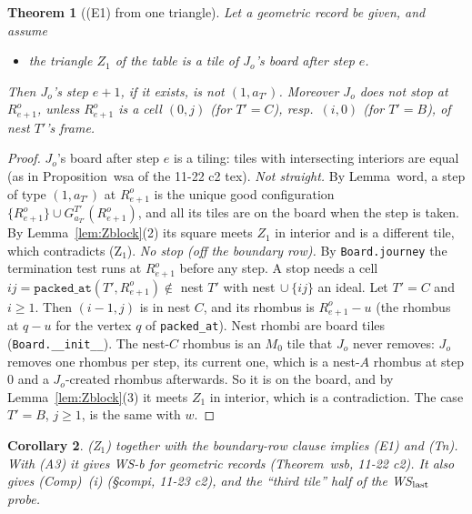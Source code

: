 \documentclass[11pt]{article}
\newtheorem{theorem}{Theorem}\newtheorem{lemma}[theorem]{Lemma}\newtheorem{proposition}[theorem]{Proposition}
\newtheorem{corollary}[theorem]{Corollary}
\theoremstyle{definition}\newtheorem{definition}[theorem]{Definition}\newtheorem{remark}[theorem]{Remark}
\begin{document}
\begin{theorem}[(E1) from one triangle]\label{thm:E1Z}
Let a geometric record be given, and assume
\begin{itemize}
\item[\textbf{(Z$_1$)}] the triangle $Z_1$ of the table is a tile of $J_o$'s board after step $e$.
\end{itemize}
Then $J_o$'s step $e+1$, if it exists, is not $(1,a_{T'})$. Moreover $J_o$ does not stop at $R^o_{e+1}$, unless $R^o_{e+1}$ is a cell $(0,j)$ (for $T'=C$), resp.\ $(i,0)$ (for $T'=B$), of nest $T'$'s frame.
\end{theorem}
\begin{proof}
$J_o$'s board after step $e$ is a tiling: tiles with intersecting interiors are equal (as in Proposition~wsa of the 11-22 c2 tex).
\emph{Not straight.} By Lemma~word, a step of type $(1,a_{T'})$ at $R^o_{e+1}$ is the unique good configuration $\{R^o_{e+1}\}\cup G^{T'}_{a_{T'}}(R^o_{e+1})$, and all its tiles are on the board when the step is taken. By Lemma~\ref{lem:Zblock}(2) its square meets $Z_1$ in interior and is a different tile, which contradicts (Z$_1$).
\emph{No stop (off the boundary row).} By \texttt{Board.journey} the termination test runs at $R^o_{e+1}$ before any step. A stop needs a cell $ij=\texttt{packed\_at}(T',R^o_{e+1})\notin$ nest $T'$ with nest$\,\cup\{ij\}$ an ideal. Let $T'=C$ and $i\ge1$. Then $(i-1,j)$ is in nest $C$, and its rhombus is $R^o_{e+1}-u$ (the rhombus at $q-u$ for the vertex $q$ of \texttt{packed\_at}). Nest rhombi are board tiles (\texttt{Board.\_\_init\_\_}). The nest-$C$ rhombus is an $M_0$ tile that $J_o$ never removes: $J_o$ removes one rhombus per step, its current one, which is a nest-$A$ rhombus at step $0$ and a $J_o$-created rhombus afterwards. So it is on the board, and by Lemma~\ref{lem:Zblock}(3) it meets $Z_1$ in interior, which is a contradiction. The case $T'=B$, $j\ge1$, is the same with $w$.
\end{proof}

\begin{corollary}\label{cor:chain}
\textup{(Z$_1$)} together with the boundary-row clause implies (E1) and (Tn). With (A3) it gives WS-b for geometric records (Theorem~wsb, 11-22 c2). It also gives (Comp)~(i) (\S compi, 11-23 c2), and the ``third tile'' half of the WS$_{\rm last}$ probe.
\end{corollary}
\end{document}
